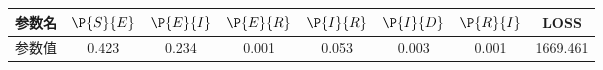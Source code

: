 \begin{tabular}{cccccccc}
\hline
参数名&$\P{S}{E}$&$\P{E}{I}$&$\P{E}{R}$&$\P{I}{R}$&$\P{I}{D}$&$\P{R}{I}$&LOSS\\
\hline
参数值&0.423&0.234&0.001&0.053&0.003&0.001&1669.461\\
\hline
\end{tabular}